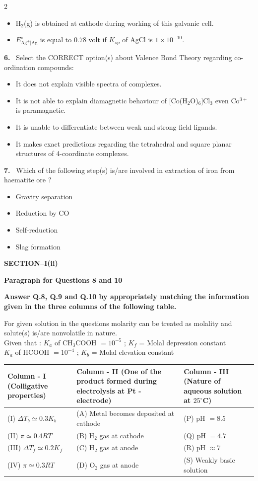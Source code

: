 \documentclass[10pt]{extarticle}
\newcommand{\sect}[1]{\par\smallskip\noindent\textbf{#1}\par}
\newcommand{\qn}[1]{\par\smallskip\noindent\textbf{#1.}~}
\newcommand{\paraq}[2]{\par\smallskip\noindent\textbf{Paragraph for Questions #1 and #2}\par}
\newenvironment{qoptions}{\begin{itemize}[leftmargin=1.8em,itemsep=1pt,topsep=2pt,label={}]}{\end{itemize}}
\newcommand{\opt}[2]{\item[(#1)] #2}
\begin{document}
\begin{multicols}{2}
\begin{qoptions}
\opt{C}{H$_2$(g) is obtained at cathode during working of this galvanic cell.}
\opt{D}{$E^\circ_{\mathrm{Ag^+|Ag}}$ is equal to $0.78$ volt if $K_{sp}$ of AgCl is $1\times10^{-10}$.}
\end{qoptions}
\qn{6} Select the CORRECT option(s) about Valence Bond Theory regarding co-ordination compounds:
\begin{qoptions}
\opt{A}{It does not explain visible spectra of complexes.}
\opt{B}{It is not able to explain diamagnetic behaviour of [Co(H$_2$O)$_6$]Cl$_3$ even Co$^{3+}$ is paramagnetic.}
\opt{C}{It is unable to differentiate between weak and strong field ligands.}
\opt{D}{It makes exact predictions regarding the tetrahedral and square planar structures of 4-coordinate complexes.}
\end{qoptions}
\qn{7} Which of the following step(s) is/are involved in extraction of iron from haematite ore ?
\begin{qoptions}
\opt{A}{Gravity separation}
\opt{B}{Reduction by CO}
\opt{C}{Self-reduction}
\opt{D}{Slag formation}
\end{qoptions}
\sect{SECTION--I(ii)}
\paraq{8}{10}
\noindent\textbf{Answer Q.8, Q.9 and Q.10 by appropriately matching the information given in the three columns of the following table.}\par
For given solution in the questions molarity can be treated as molality and solute(s) is/are nonvolatile in nature.\\
Given that : $K_a$ of CH$_3$COOH $=10^{-5}$ ; $K_f$ = Molal depression constant\\
\hspace*{4.9em}$K_a$ of HCOOH $=10^{-4}$ ; $K_b$ = Molal elevation constant
\end{multicols}
\begin{center}\small\setlength{\tabcolsep}{4pt}
\begin{tabular}{|p{3.8cm}|p{5.6cm}|p{4.6cm}|}\hline
\textbf{Column - I} (Colligative properties) & \textbf{Column - II} (One of the product formed during electrolysis at Pt - electrode) & \textbf{Column - III} (Nature of aqueous solution at $25^\circ$C)\\\hline
(I) $\Delta T_b\simeq0.3K_b$ & (A) Metal becomes deposited at cathode & (P) pH $=8.5$\\\hline
(II) $\pi\simeq0.4RT$ & (B) H$_2$ gas at cathode & (Q) pH $=4.7$\\\hline
(III) $\Delta T_f\simeq0.2K_f$ & (C) H$_2$ gas at anode & (R) pH $\approx7$\\\hline
(IV) $\pi\simeq0.3RT$ & (D) O$_2$ gas at anode & (S) Weakly basic solution\\\hline
\end{tabular}
\end{center}
\end{document}
